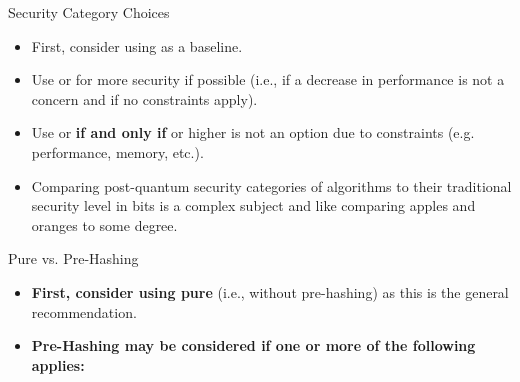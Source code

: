 \begin{minipage}[t]{0.28\textwidth}
    \vspace{0pt}
    \begin{algorithmbox}{Security Category Choices}
        \scriptsize
        \begin{itemize}[leftmargin=*]
            \setlength\itemsep{0em}
            \item First, consider using \hspace{-3mm} as a baseline.\\
            \item Use \hspace{-3mm} or
            \hspace{-3mm} for more security if possible (i.e., if a decrease in performance is not a concern and if no constraints apply).\\
            \item Use \hspace{-3mm} or
            \hspace{-3mm} {\bfseries if and only if} \hspace{-3mm} or higher is not an option due to constraints (e.g. performance, memory, etc.).\\
            \item Comparing post-quantum security categories of algorithms to their traditional security level in bits is a complex subject and like comparing apples and oranges to some degree.
        \end{itemize}
    \end{algorithmbox}
    \vfill
    \begin{algorithmbox}{Pure vs. Pre-Hashing}
        \scriptsize
        \begin{itemize}[leftmargin=*]
            \setlength\itemsep{0em}
            \item {\bfseries First, consider using  pure} (i.e., without pre-hashing) as this is the general recommendation.\\
            \item {\bfseries Pre-Hashing may be considered if one or more of the following applies:}

\end{itemize}
\end{algorithmbox}
\end{minipage}
